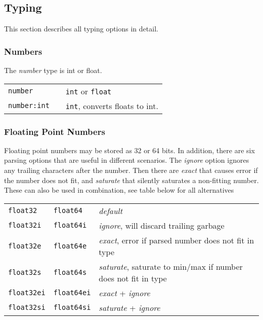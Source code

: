 \clearpage
\subsection{Typing}
This section describes all typing options in detail.

\subsubsection{Numbers}
The \emph{number} type is int or float.
\begin{leftbar}
\begin{tabular}{p{2cm}p{2cm}p{9cm}}
  \texttt{number}     && \texttt{int} or \texttt{float} \\
  \texttt{number:int} && \texttt{int}, converts floats to int.\\
\end{tabular}
\end{leftbar}


\subsubsection{Floating Point Numbers}
Floating point numbers may be stored as 32 or 64 bits.  In addition,
there are six parsing options that are useful in different scenarios.
The \emph{ignore} option ignores any trailing characters after the
number.  Then there are \emph{exact} that causes error if the number
does not fit, and \emph{saturate} that silently saturates a
non-fitting number.  These can also be used in combination, see table
below for all alternatives
\begin{leftbar}
\begin{tabular}{p{2cm}p{2cm}p{9cm}}
\texttt{float32} & \texttt{float64} & \emph{default}\\
\texttt{float32i} & \texttt{float64i} & \emph{ignore}, will discard trailing garbage\\
\texttt{float32e} & \texttt{float64e} & \emph{exact}, error if parsed number does not fit in type \\
\texttt{float32s} & \texttt{float64s} & \emph{saturate}, saturate to min/max if number does not fit in type \\
\texttt{float32ei} & \texttt{float64ei} & \emph{exact} + \emph{ignore} \\
\texttt{float32si} & \texttt{float64si} & \emph{saturate} + \emph{ignore} \\
\end{tabular}
\end{leftbar}

